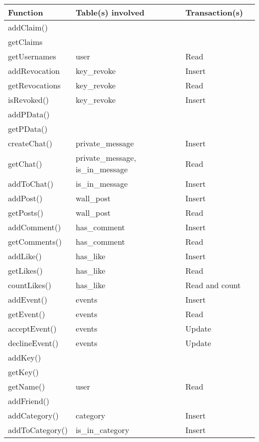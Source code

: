 \begin{center}
    \begin{tabular}{ | l | l | l | p{5cm} |}
    \hline
    Function        & Table(s) involved & Transaction(s) \\ \hline
    addClaim()      &                   &                \\ \hline 
    getClaims       &                   &                \\ \hline 
    getUsernames    & user              & Read           \\ \hline 
    addRevocation   & key\_revoke       & Insert         \\ \hline 
    getRevocations  & key\_revoke       &    Read        \\ \hline 
    isRevoked()     & key\_revoke       &  Insert        \\ \hline 
    addPData()      &                   &                \\ \hline 
    getPData()      &                   &                \\ \hline 
    createChat()    & private\_message  &  Insert        \\ \hline 
    getChat()       & private\_message, is\_in\_message             & Read           \\ \hline 
    addToChat()     & is\_in\_message   &   Insert       \\ \hline 
    addPost()       & wall\_post        &  Insert        \\ \hline 
    getPosts()      & wall\_post        &    Read        \\ \hline 
    addComment()    & has\_comment      &   Insert       \\ \hline 
    getComments()   & has\_comment      &  Read          \\ \hline 
    addLike()       & has\_like         &  Insert        \\ \hline 
    getLikes()      & has\_like         &  Read          \\ \hline 
    countLikes()    & has\_like         &  Read and count\\ \hline 
    addEvent()      & events            &    Insert      \\ \hline 
    getEvent()      & events            &  Read          \\ \hline 
    acceptEvent()   & events            &   Update       \\ \hline 
    declineEvent()  & events            &  Update        \\ \hline 
    addKey()        &                   &                \\ \hline 
    getKey()        &                   &                \\ \hline 
    getName()       & user              &  Read          \\ \hline 
    addFriend()     &                   &                \\ \hline 
    addCategory()   & category          &     Insert     \\ \hline  
    addToCategory() & is\_in\_category  &   Insert       \\ \hline 


\end{tabular}
\end{center}
